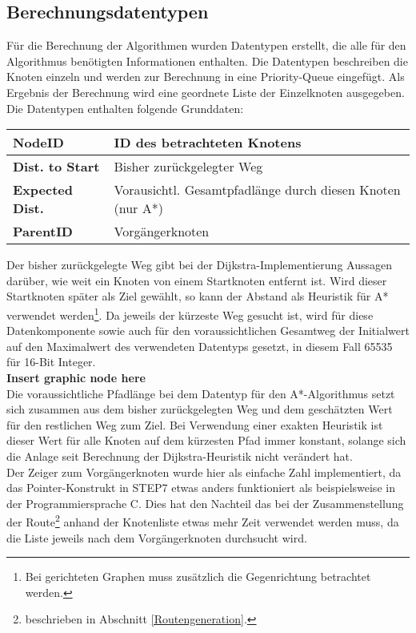 		\subsection{Berechnungsdatentypen}
			\label{Datentypen_Berechnung}
			Für die Berechnung der Algorithmen wurden Datentypen erstellt, die alle für den Algorithmus benötigten Informationen enthalten. Die Datentypen beschreiben die Knoten einzeln und werden zur Berechnung in eine Priority-Queue eingefügt. Als Ergebnis der Berechnung wird eine geordnete Liste der Einzelknoten ausgegeben. Die Datentypen enthalten folgende Grunddaten:
			
			\begin{longtable}{| l | l |}
				\hline
				\textbf{NodeID} & ID des betrachteten Knotens\\ \hline
				\textbf{Dist. to Start} & Bisher zurückgelegter Weg\\ \hline
				\textbf{Expected Dist.} & Vorausichtl. Gesamtpfadlänge durch diesen Knoten (nur A*)\\ \hline
				\textbf{ParentID} & Vorgängerknoten\\
				\hline
			\end{longtable}
			
			Der bisher zurückgelegte Weg gibt bei der Dijkstra-Implementierung Aussagen darüber, wie weit ein Knoten von einem Startknoten entfernt ist. Wird dieser Startknoten später als Ziel gewählt, so kann der Abstand als Heuristik für A* verwendet werden\footnote{Bei gerichteten Graphen muss zusätzlich die Gegenrichtung betrachtet werden.}. Da jeweils der kürzeste Weg gesucht ist, wird für diese Datenkomponente sowie auch für den voraussichtlichen Gesamtweg der Initialwert auf den Maximalwert des verwendeten Datentyps gesetzt, in diesem Fall 65535 für 16-Bit Integer.
			\\
			\textbf{Insert graphic node here}
			\\
			Die voraussichtliche Pfadlänge bei dem Datentyp für den A*-Algorithmus setzt sich zusammen aus dem bisher zurückgelegten Weg und dem geschätzten Wert für den restlichen Weg zum Ziel. Bei Verwendung einer exakten Heuristik ist dieser Wert für alle Knoten auf dem kürzesten Pfad immer konstant, solange sich die Anlage seit Berechnung der Dijkstra-Heuristik nicht verändert hat.
			\\
			Der Zeiger zum Vorgängerknoten wurde hier als einfache Zahl implementiert, da das Pointer-Konstrukt in \ac{STEP7} etwas anders funktioniert als beispielsweise in der Programmiersprache C. Dies hat den Nachteil das bei der Zusammenstellung der Route\footnote{beschrieben in Abschnitt \ref{Routengeneration}.} anhand der Knotenliste etwas mehr Zeit verwendet werden muss, da die Liste jeweils nach dem Vorgängerknoten durchsucht wird.
		
